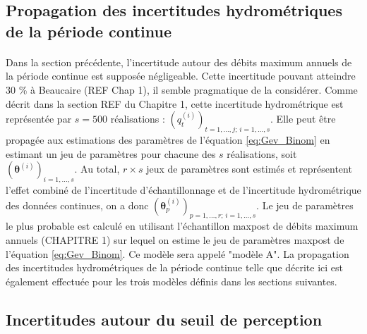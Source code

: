 \documentclass[11pt]{article}
\begin{document}
	

	
	\subsection{Propagation des incertitudes hydrométriques de la période continue}
	
	\paragraph{}
	Dans la section précédente, l'incertitude autour des débits maximum annuels de la période continue est supposée négligeable. Cette incertitude pouvant atteindre 30 \% à Beaucaire (REF Chap 1), il semble pragmatique de la considérer. Comme décrit dans la section REF du Chapitre 1, cette incertitude hydrométrique est représentée par $s = 500$ réalisations : $(q_t^{(i)})_{t=1,...,j;\,i=1,...,s}$. Elle peut être propagée aux estimations des paramètres de l'équation \ref{eq:Gev_Binom} en estimant un jeu de paramètres pour chacune des $s$ réalisations, soit $(\boldsymbol{\theta}
	^{(i)})_{i=1,...,s}$. Au total, $r \times s$ jeux de paramètres sont estimés et représentent l'effet combiné de l'incertitude d'échantillonnage et de l'incertitude hydrométrique des données continues, on a donc $(\boldsymbol{\theta}^{(i)}_p)_{p=1,...,r;\, i=1,...,s}$. Le jeu de paramètres le plus probable est calculé en utilisant l'échantillon maxpost de débits maximum annuels (CHAPITRE 1) sur lequel on estime le jeu de paramètres maxpost de l'équation \ref{eq:Gev_Binom}. Ce modèle sera appelé "modèle A". La propagation des incertitudes hydrométriques de la période continue telle que décrite ici est également effectuée pour les trois modèles définis dans les sections suivantes.
	
	\subsection{Incertitudes autour du seuil de perception}
	
\end{document}
